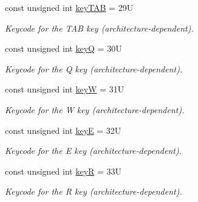 \begin{DoxyCompactItemize}
const unsigned int \hyperlink{namespacecimg__library__suffixed_1_1cimg_a81af09cfde415c7b19ceab15598e0949}{key\+T\+AB} = 29U
\begin{DoxyCompactList}\small\item\em Keycode for the {\ttfamily T\+AB} key (architecture-\/dependent). \end{DoxyCompactList}\item 
\mbox{\label{namespacecimg__library__suffixed_1_1cimg_a16d6a98a85bf533af7cb3ac213e3ddb0}} 
const unsigned int \hyperlink{namespacecimg__library__suffixed_1_1cimg_a16d6a98a85bf533af7cb3ac213e3ddb0}{keyQ} = 30U
\begin{DoxyCompactList}\small\item\em Keycode for the {\ttfamily Q} key (architecture-\/dependent). \end{DoxyCompactList}\item 
\mbox{\label{namespacecimg__library__suffixed_1_1cimg_a494b7aca59a8f915392b3dbd50455c5a}} 
const unsigned int \hyperlink{namespacecimg__library__suffixed_1_1cimg_a494b7aca59a8f915392b3dbd50455c5a}{keyW} = 31U
\begin{DoxyCompactList}\small\item\em Keycode for the {\ttfamily W} key (architecture-\/dependent). \end{DoxyCompactList}\item 
\mbox{\label{namespacecimg__library__suffixed_1_1cimg_af07256d6fa14068d70db6a835f6893f7}} 
const unsigned int \hyperlink{namespacecimg__library__suffixed_1_1cimg_af07256d6fa14068d70db6a835f6893f7}{keyE} = 32U
\begin{DoxyCompactList}\small\item\em Keycode for the {\ttfamily E} key (architecture-\/dependent). \end{DoxyCompactList}\item 
\mbox{\label{namespacecimg__library__suffixed_1_1cimg_a5545270ccb8e97b24f3c07362b301a8b}} 
const unsigned int \hyperlink{namespacecimg__library__suffixed_1_1cimg_a5545270ccb8e97b24f3c07362b301a8b}{keyR} = 33U
\begin{DoxyCompactList}\small\item\em Keycode for the {\ttfamily R} key (architecture-\/dependent). \end{DoxyCompactList}\item 

\end{DoxyCompactItemize}
